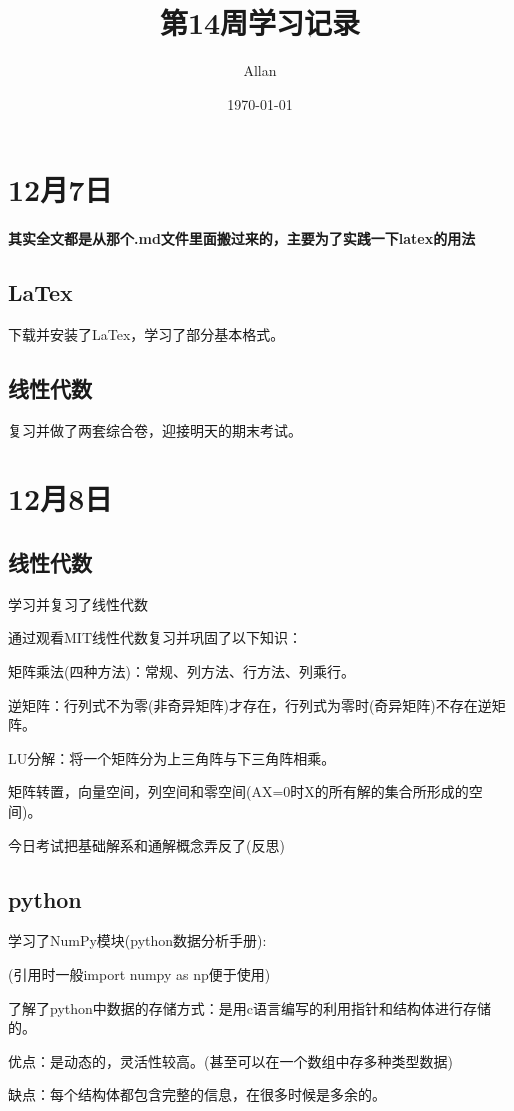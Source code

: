 \documentclass[UTF8]{ctexart}
\title{第14周学习记录}
\author{Allan}
\date{\today}
\begin{document}
\maketitle
\tableofcontents
\section{12月7日}
\paragraph{ 其实全文都是从那个.md文件里面搬过来的，主要为了实践一下latex的用法}
\subsection{LaTex}
下载并安装了LaTex，学习了部分基本格式。
\subsection{线性代数}
复习并做了两套综合卷，迎接明天的期末考试。
\section{12月8日}
\subsection{线性代数}
学习并复习了线性代数

通过观看MIT线性代数复习并巩固了以下知识：

矩阵乘法(四种方法)：常规、列方法、行方法、列乘行。

逆矩阵：行列式不为零(非奇异矩阵)才存在，行列式为零时(奇异矩阵)不存在逆矩阵。

LU分解：将一个矩阵分为上三角阵与下三角阵相乘。

矩阵转置，向量空间，列空间和零空间(AX=0时X的所有解的集合所形成的空间)。

今日考试把基础解系和通解概念弄反了(反思)
\subsection{python}
学习了NumPy模块(python数据分析手册):

(引用时一般import numpy as np便于使用)

了解了python中数据的存储方式：是用c语言编写的利用指针和结构体进行存储的。

优点：是动态的，灵活性较高。(甚至可以在一个数组中存多种类型数据)

缺点：每个结构体都包含完整的信息，在很多时候是多余的。
\end{document}
